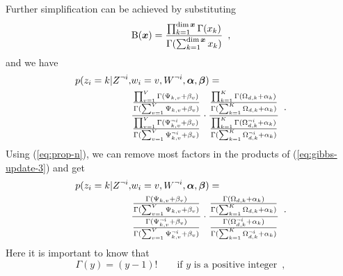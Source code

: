 Further simplification can be achieved by substituting
\begin{equation}
  \label{eq:delta}
  \operatorname{B}(\boldsymbol{x}) =
  \frac{
    \prod_{k=1}^{\dim \boldsymbol{x}} \Gamma(x_k)
  }{
   \Gamma( \sum_{k=1}^{\dim \boldsymbol{x}} x_k )
  }
  \enspace,
\end{equation}
and we have
\begin{equation}
  \label{eq:gibbs-update-3}
  \begin{split}
  p(z_i=k|Z^{\neg i},&w_i=v,W^{\neg i},\boldsymbol{\alpha},\boldsymbol{\beta})  =
  \\
  &
  \frac{
    \frac{
      \prod_{v=1}^{V} \Gamma( \Psi_{k,v} + \beta_{v} )
    }{
      \Gamma( \sum_{v=1}^{V} \Psi_{k,v} + \beta_{v} )
    }
  }{
    \frac{
      \prod_{v=1}^{V} \Gamma( \Psi_{k,v}^{\neg i} + \beta_{v} )
    }{
      \Gamma( \sum_{v=1}^{V} \Psi_{k,v}^{\neg i} + \beta_{v} )
    }
  }
  \cdot
  \frac{
    \frac{
      \prod_{k=1}^{K} \Gamma( \Omega_{d,k} + \alpha_{k} )
    }{
      \Gamma( \sum_{k=1}^{K} \Omega_{d,k} + \alpha_{k} )
    }
  }{
    \frac{
      \prod_{k=1}^{K} \Gamma( \Omega_{d,k}^{\neg i} + \alpha_{k} )
    }{
      \Gamma( \sum_{k=1}^{K} \Omega_{d,k}^{\neg i} + \alpha_{k} )
    }
  }
  \end{split}
  \enspace.
\end{equation}
%
Using (\ref{eq:prop-n}), we can remove most factors in the products of
%
(\ref{eq:gibbs-update-3}) and get
\begin{equation}
  \label{eq:gibbs-update-4}
  \begin{split}
    p(z_i=k|Z^{\neg i},&w_i=v,W^{\neg i},\boldsymbol{\alpha},\boldsymbol{\beta})  =
    \\
    &
    \frac{
      \frac{
        \Gamma( \Psi_{k,v} + \beta_{v} )
      }{
        \Gamma( \sum_{v=1}^{V} \Psi_{k,v} + \beta_{v} )
      }
    }{
      \frac{
        \Gamma( \Psi_{k,v}^{\neg i} + \beta_{v} )
      }{
        \Gamma( \sum_{v=1}^{V} \Psi_{k,v}^{\neg i} + \beta_{v} )
      }
    }
    \cdot
    \frac{
      \frac{
        \Gamma( \Omega_{d,k} + \alpha_{k} )
      }{
        \Gamma( \sum_{k=1}^{K} \Omega_{d,k} + \alpha_{k} )
      }
    }{
      \frac{
        \Gamma( \Omega_{d,k}^{\neg i} + \alpha_{k} )
      }{
        \Gamma( \sum_{k=1}^{K} \Omega_{d,k}^{\neg i} + \alpha_{k} )
      }
    }
  \end{split}
  \enspace.
\end{equation}
Here it is important to know that
\begin{equation}
  \label{eq:gamma}
  \Gamma(y) = (y-1)! \qquad \text{if $y$ is a positive integer}
  \enspace,
\end{equation}
